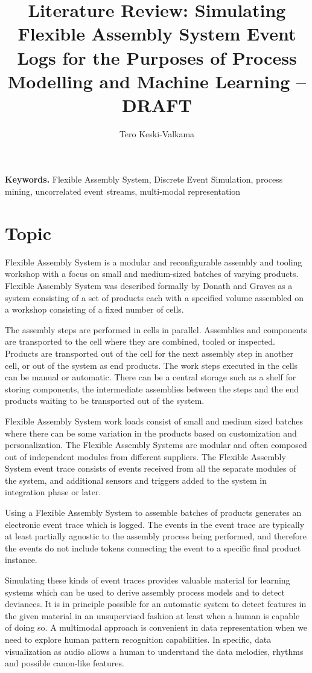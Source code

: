 \documentclass[a4paper,10pt]{article}
\title{Literature Review: Simulating Flexible Assembly System Event Logs for the Purposes of Process Modelling and Machine Learning – DRAFT}
\author{Tero Keski-Valkama}
\begin{document}
\maketitle

\smallskip
\noindent \textbf{Keywords.} Flexible Assembly System, Discrete Event Simulation, process mining, uncorrelated event streams, multi-modal representation

\section{Topic}
Flexible Assembly System is a modular and reconfigurable assembly and tooling workshop with a focus on small and medium-sized batches of varying products.
Flexible Assembly System was described formally by Donath and Graves \cite{donath1988flexible} as a system consisting of a set of products each with a specified volume
assembled on a workshop consisting of a fixed number of cells.

The assembly steps are performed in cells in parallel. Assemblies and components are transported to the cell where they are combined, tooled or inspected. Products
are transported out of the cell for the next assembly step in another cell, or out of the system as end products.
The work steps executed in the cells can be manual or automatic. There can be a central storage such as a shelf for storing components, the intermediate assemblies between the steps
and the end products waiting to be transported out of the system.

Flexible Assembly System work loads consist of small and medium sized batches where there can be some variation in the products based on customization and personalization.
The Flexible Assembly Systems are modular and often composed out of independent modules from different suppliers. The Flexible Assembly System event trace consists
of events received from all the separate modules of the system, and additional sensors and triggers added to the system in integration phase or later.

Using a Flexible Assembly System to assemble batches of products generates an electronic event trace which is logged. The events in the event trace are typically at least
partially agnostic to the assembly process being performed, and therefore the events do not include tokens connecting the event to a specific final product instance.

Simulating these kinds of event traces provides valuable material for learning systems which can be used to derive assembly process models and to detect deviances.
It is in principle possible for an automatic system to detect features in the given material in an unsupervised fashion at least when a human is capable of doing so.
A multimodal approach is convenient in data representation when we need to explore human pattern recognition capabilities. In specific, data visualization as audio
allows a human to understand the data melodies, rhythms and possible canon-like features.
\end{document}
